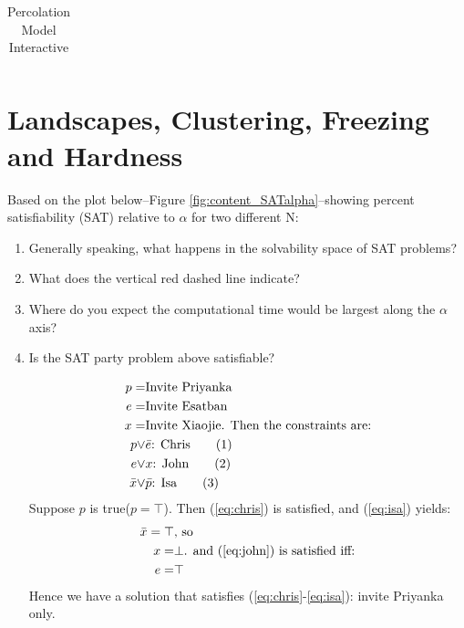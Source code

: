\documentclass[]{article}
\newcommand\numberthis{\addtocounter{equation}{1}\tag{\theequation}}
\begin{document}
\begin{table}[H]
	\begin{center}
		\caption{Percolation Model Interactive}\label{eq:percolation}
		\begin{tabular}{|c|c|}\hline
			&\\ \hline
		\end{tabular}
	\end{center}
\end{table}

\section{Landscapes, Clustering, Freezing and Hardness}

Based on the plot below--Figure \ref{fig:content_SATalpha}--showing percent satisfiability (SAT) relative to $\alpha$ for two different N:

\begin{enumerate}
	\item  Generally speaking, what happens in the solvability space of SAT problems?

	\item  What does the vertical red dashed line indicate?

	\item   Where do you expect the computational time would be largest along the $\alpha$ axis?

	\item   Is the SAT party problem above satisfiable?
	
	\begin{align*}
		p =& \text{Invite Priyanka}\\
		e =& \text {Invite Esatban}\\
		x =& \text{Invite Xiaojie. Then the constraints are:}\\
		p \lor& \bar{e} \text{: Chris} \numberthis \label{eq:chris}\\
		e \lor& x \text{: John} \numberthis \label{eq:john}\\
		\bar{x} \lor& \bar{p} \text{: Isa} \numberthis \label{eq:isa}
	\end{align*}
	Suppose $p$ is true($p=\top$). Then (\ref{eq:chris}) is satisfied, and (\ref{eq:isa}) yields:
	\begin{align*}
		\bar{x}=\top& \text{, so}\\
		x =& \bot \text{. and (\ref{eq:john}) is satisfied iff:}\\
		e =& \top 
	\end{align*}
	Hence we have a solution that satisfies (\ref{eq:chris}-\ref{eq:isa}): invite Priyanka only.
\end{enumerate}
\end{document}

